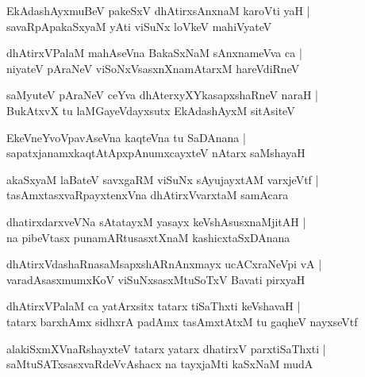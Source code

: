 \documentclass[twoside,12pt,openright]{book}
\newcounter{shloka}[chapter]
\begin{document}
\begin{shloka}%
EkAdashAyxmuBeV pakeSxV dhAtirxsAnxnaM karoVti yaH |\\
savaRpApakaSxyaM yAti viSuNx loVkeV mahiVyateV 
\end{shloka}

\begin{shloka}%
dhAtirxVPalaM mahAseVna BakaSxNaM sAnxnameVva ca |\\
niyateV pAraNeV viSoNxVsasxnXnamAtarxM hareVdiRneV
\end{shloka}

\begin{shloka}%
saMyuteV pAraNeV ceYva dhAterxyXYkasapxshaRneV naraH |\\
BukAtxvX tu laMGayeVdayxsutx EkAdashAyxM sitAsiteV 
\end{shloka}

\begin{shloka}%
EkeVneYvoVpavAseVna kaqteVna tu SaDAnana |\\
sapatxjanamxkaqtAtApxpAnumxcayxteV nAtarx saMshayaH 
\end{shloka}

\begin{shloka}%
akaSxyaM laBateV savxgaRM viSuNx sAyujayxtAM varxjeVtf |\\
tasAmxtasxvaRpayxtenxVna dhAtirxVvarxtaM samAcara
\end{shloka}

\begin{shloka}%
dhatirxdarxveVNa sAtatayxM yasayx keVshAsusxnaMjitAH |\\
na pibeVtasx punamARtusasxtXnaM kashicxtaSxDAnana
\end{shloka}

\begin{shloka}%
dhAtirxVdashaRnasaMsapxshARnAnxmayx ucACxraNeVpi vA |\\
varadAsasxmumxKoV viSuNxsasxMtuSoTxV Bavati pirxyaH 
\end{shloka}

\begin{shloka}%
dhAtirxVPalaM ca yatArxsitx tatarx tiSaThxti keVshavaH |\\
tatarx barxhAmx sidhxrA padAmx tasAmxtAtxM tu gaqheV nayxseVtf
\end{shloka}

\begin{shloka}%
alakiSxmXVnaRshayxteV tatarx yatarx dhatirxV parxtiSaThxti |\\
saMtuSATxsasxvaRdeVvAshacx na tayxjaMti kaSxNaM mudA 
\end{shloka}
\end{document}

